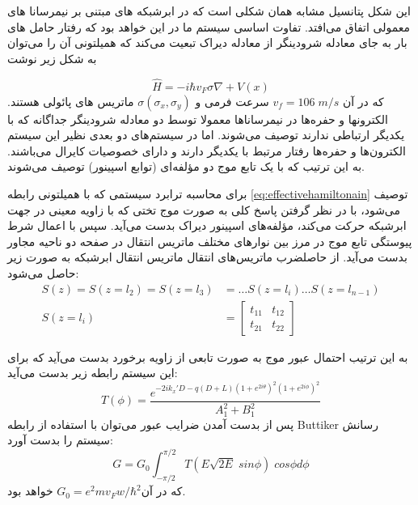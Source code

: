 این شکل پتانسیل مشابه همان شکلی است که در ابرشبکه های مبتنی بر نیمرسانا های معمولی اتفاق می‌افتد. تفاوت اساسی سیستم ما در این خواهد بود که رفتار حامل های بار به جای معادله شرودینگر از معادله دیراک تبعیت می‌کند که همیلتونی آن را می‌توان به شکل زیر نوشت

\begin{equation}
	\hat{H} = -i\hbar v_F\sigma \nabla + V(x)
    \label{eq:effectivehamiltonain}
\end{equation}
که در آن $v_f = 106 \; m/s$ سرعت فرمی و $\sigma(\sigma_x,\sigma_y)$ ماتریس های پائولی هستند. الکترونها و حفره‌ها در نیمرساناها معمولا توسط دو معادله شرودینگر جداگانه که با یکدیگر ارتباطی ندارند توصیف می‌شوند. اما در سیستم‌های دو بعدی نظیر این سیستم الکترون‌ها و حفره‌ها رفتار مرتبط با یکدیگر دارند و دارای خصوصیات کایرال می‌باشند. به این ترتیب که با یک تابع موج دو مؤلفه‌ای (توابع اسپینور) توصیف می‌شوند.

برای محاسبه ترابرد سیستمی که با همیلتونی رابطه \ref{eq:effectivehamiltonain} توصیف می‌شود، با در نظر گرفتن پاسخ کلی به صورت موج تختی که با زاویه معینی در جهت ابرشبکه حرکت می‌کند، مؤلفه‌های اسپینور دیراک بدست می‌آید. سپس با اعمال شرط پیوستگی تابع موج در مرز بین نوارهای مختلف ماتریس انتقال در صفحه دو ناحیه مجاور بدست می‌آید. از حاصلضرب ماتریس‌های انتقال ماتریس انتقال ابرشبکه به صورت زیر حاصل می‌شود:
\begin{equation}
    \begin{split}
    S(z) = S(z=l_{2}) = S(z=l_{3}) &= \dots S(z=l_{i})       \dots S(z=l_{n-1})\\
    S(z=l_{i}) &= 
        \begin{bmatrix} 
            t_{11} & t_{12} \\
            t_{21} & t_{22}
        \end{bmatrix}
    \end{split}
\end{equation}

به این ترتیب احتمال عبور موج به صورت تابعی از زاویه برخورد بدست می‌آید که برای این سیستم رابطه زیر بدست می‌آید:
\begin{equation}
    T(\phi) = \frac{e^{-2ik_x\prime D-q(D+L)(1+e^{2i\theta})^2(1+e^{2i\phi})^2}}{A_1^2 + B_1^2}
\end{equation}
پس از  بدست آمدن ضرایب عبور می‌توان با استفاده از رابطه \gls{Buttiker} رسانش سیستم را بدست آورد:
\begin{equation}
    G = G_0 \int_{-\pi/2}^{\pi/2} T(E\sqrt{2E}\; sin\phi)\; cos\phi d\phi
\end{equation}
که در آن$G_0 = e^2m v_F w/\hbar^2$ خواهد بود.

